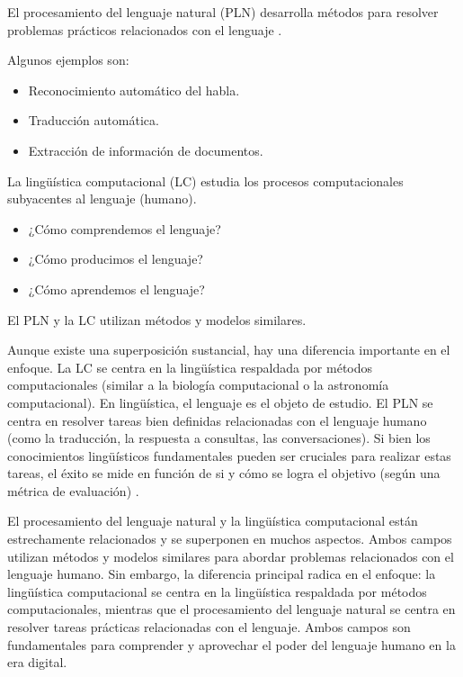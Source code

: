 \documentclass{book}
\begin{document}
El procesamiento del lenguaje natural (PLN) desarrolla métodos para resolver problemas prácticos relacionados con el lenguaje \cite{JohnsonMLSS}.

Algunos ejemplos son:

\begin{itemize}
  \item Reconocimiento automático del habla.
  \item Traducción automática.
  \item Extracción de información de documentos.
\end{itemize}

La lingüística computacional (LC) estudia los procesos computacionales subyacentes al lenguaje (humano).

\begin{itemize}
  \item ¿Cómo comprendemos el lenguaje?
  \item ¿Cómo producimos el lenguaje?
  \item ¿Cómo aprendemos el lenguaje?
\end{itemize}

El PLN y la LC utilizan métodos y modelos similares.


Aunque existe una superposición sustancial, hay una diferencia importante en el enfoque. La LC se centra en la lingüística respaldada por métodos computacionales (similar a la biología computacional o la astronomía computacional). En lingüística, el lenguaje es el objeto de estudio. El PLN se centra en resolver tareas bien definidas relacionadas con el lenguaje humano (como la traducción, la respuesta a consultas, las conversaciones). Si bien los conocimientos lingüísticos fundamentales pueden ser cruciales para realizar estas tareas, el éxito se mide en función de si y cómo se logra el objetivo (según una métrica de evaluación) \cite{jacobbook}.



El procesamiento del lenguaje natural y la lingüística computacional están estrechamente relacionados y se superponen en muchos aspectos. Ambos campos utilizan métodos y modelos similares para abordar problemas relacionados con el lenguaje humano. Sin embargo, la diferencia principal radica en el enfoque: la lingüística computacional se centra en la lingüística respaldada por métodos computacionales, mientras que el procesamiento del lenguaje natural se centra en resolver tareas prácticas relacionadas con el lenguaje. Ambos campos son fundamentales para comprender y aprovechar el poder del lenguaje humano en la era digital.
\end{document}
